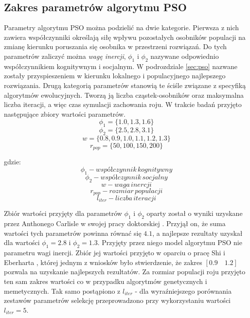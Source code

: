 \subsection{Zakres parametrów algorytmu PSO}
\par
Parametry algorytmu PSO można podzielić na dwie kategorie. Pierwsza z nich zawiera współczynniki określają siłę wpływu pozostałych osobników populacji na zmianę kierunku poruszania się osobnika w przestrzeni rozwiązań. Do tych parametrów zaliczyć można \emph{wagę inercji}, $\phi_1$ i $\phi_2$ nazywane odpowiednio współczynnikiem kognitywnym i socjalnym. W podrozdziale \ref{sec:pso} nazwane zostały przyspieszeniem w kierunku lokalnego i populacyjnego najlepszego rozwiązania. Drugą kategorią parametrów stanowią te ściśle związane z specyfiką algorytmów ewolucyjnych. Tworzą ją liczba cząstek-osobników oraz maksymalna liczba iteracji, a więc czas symulacji zachowania roju. W trakcie badań przyjęto następujące zbiory wartości parametrów.
\[\phi_1 = \lbrace1.0, 1.3, 1.6 \rbrace\]
\[\phi_2 = \lbrace2.5, 2.8, 3.1\rbrace\]
\[w = \lbrace0.8, 0.9, 1.0, 1.1, 1.2, 1.3\rbrace\]
\[r_{pop} = \lbrace50, 100, 150, 200\rbrace\]

gdzie:
\[\phi_1 - współczynnik\, kognitywny\]
\[\phi_2 - współczynnik\, socjalny\]
\[w - waga\, inercji\]
\[r_{pop} - rozmiar\, populacji\]
\[l_{iter} - liczba\, iteracji\]
\par
Zbiór wartości przyjęty dla parametrów $\phi_1$ i $\phi_2$ oparty został o wyniki uzyskane przez Anthonego Carlisle w swojej pracy doktorskiej \cite{carlisle2002applying}. Przyjął on, że suma wartości tych parametrów powinna równać się $4.1$, a najlepsze rezultaty uzyskał dla wartości $\phi_1=2.8$ i $\phi_2=1.3$. Przyjęty przez niego model algorytmu PSO nie parametru wagi inercji. Zbiór jej wartości przyjęto w oparciu o pracę Shi i Eberharta \cite{shi1998modified}, której jednym z wniosków było stwierdzenie, że zakres $[0.9\quad1.2]$ pozwala na uzyskanie najlepszych rezultatów. Za rozmiar populacji roju przyjęto ten sam zakres wartości co w przypadku algorytmów genetycznych i memetycznych. Tak samo postąpiono z $l_{iter}$ - dla wyraźniejszego porównania zestawów parametrów selekcję przeprowadzono przy wykorzystaniu wartości $l_{iter}=5$.


